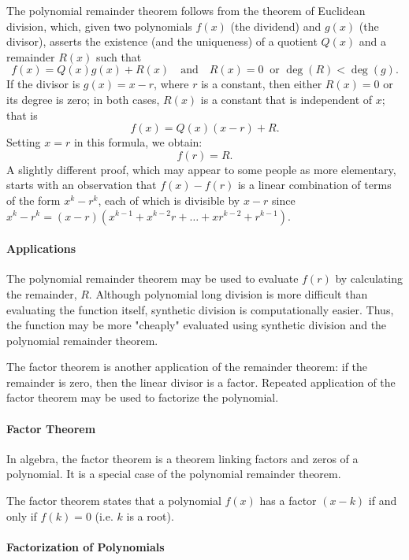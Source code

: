The polynomial remainder theorem follows from the theorem of Euclidean division, which, given two polynomials $f(x)$ (the dividend) and $g(x)$ (the divisor), asserts the existence (and the uniqueness) of a quotient $Q(x)$ and a remainder $R(x)$ such that
$$
f(x) = Q(x)g(x) + R(x) \quad \text{and} \quad R(x) = 0 \ \text{ or } \deg(R) < \deg(g).
$$
If the divisor is $g(x) = x - r$, where $r$ is a constant, then either $R(x) = 0$ or its degree is zero; in both cases, $R(x)$ is a constant that is independent of $x$; that is
$$
f(x) = Q(x)(x - r) + R.
$$
Setting $x = r$ in this formula, we obtain:
$$
f(r) = R.
$$
A slightly different proof, which may appear to some people as more elementary, starts with an observation that $f(x) - f(r)$ is a linear combination of terms of the form $x^k - r^k$, each of which is divisible by $x - r$ since $x^k - r^k = (x - r)(x^{k-1} + x^{k-2}r + \dots + xr^{k-2} + r^{k-1})$.

\paragraph{Applications}

The polynomial remainder theorem may be used to evaluate $f(r)$ by calculating the remainder, $R$. Although polynomial long division is more difficult than evaluating the function itself, synthetic division is computationally easier. Thus, the function may be more "cheaply" evaluated using synthetic division and the polynomial remainder theorem.

The factor theorem is another application of the remainder theorem: if the remainder is zero, then the linear divisor is a factor. Repeated application of the factor theorem may be used to factorize the polynomial.

\paragraph{Factor Theorem}

In algebra, the factor theorem is a theorem linking factors and zeros of a polynomial. It is a special case of the polynomial remainder theorem.

The factor theorem states that a polynomial $f(x)$ has a factor $(x - k)$ if and only if $f(k) = 0$ (i.e. $k$ is a root).

\paragraph{Factorization of Polynomials}

